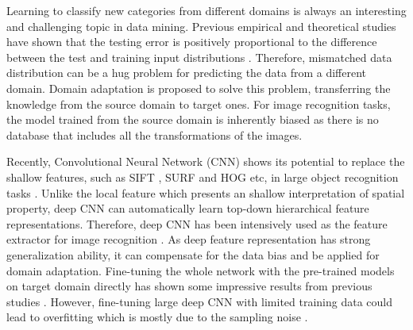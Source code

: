 ﻿Learning to classify new categories from different domains is always an interesting and challenging topic in data mining.
Previous empirical and theoretical studies have shown that the testing error is positively proportional to the difference between the test and training input distributions \cite{ben2007analysis} \cite{blitzer2008learning}. Therefore, mismatched data distribution can be a hug problem for predicting the data from a different domain. Domain adaptation is proposed to solve this problem, transferring the knowledge from the source domain to target ones. For image recognition tasks, the model trained from the source domain is inherently biased as there is no database that includes all the transformations of the images.

Recently, Convolutional Neural Network (CNN) shows its potential to replace the shallow features, such as SIFT \cite{lowe1999object}, SURF \cite{bay2006surf} and HOG \cite{dalal2005histograms} etc, in large object recognition tasks \cite{krizhevsky2012imagenet} \cite{zeiler2014visualizing} \cite{simonyan2014very}. Unlike the local feature which presents an shallow interpretation of spatial property, deep CNN can automatically learn top-down hierarchical feature representations. Therefore, deep CNN has been intensively used as the feature extractor for image recognition \cite{farabet2013learning}. As deep feature representation has strong generalization ability, it can compensate for the data bias and be applied for domain adaptation. Fine-tuning the whole network with the pre-trained models on target domain directly has shown some impressive results from previous studies \cite{Chatfield14} \cite{zeiler2014visualizing} \cite{hoffman2013one} \cite{NIPS2014_Zhou}.
However, fine-tuning large deep CNN with limited training data could lead to overfitting which is mostly due to the sampling noise \cite{srivastava2014dropout}.

